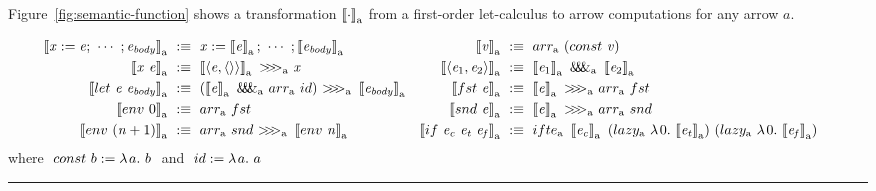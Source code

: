 \documentclass[preprint]{sigplanconf}
\newcommand{\arrow}{\rightsquigarrow}
\newcommand{\arrowarr}{\ensuremath{arr}}
\newcommand{\arrowcomp}{\ensuremath{{>}\mspace{-6mu}{>}\mspace{-6mu}{>}}}
\newcommand{\arrowpair}{\ensuremath{\mathit{\&\mspace{-7.5mu}\&\mspace{-7.5mu}\&}}}
\newcommand{\arrowif}{\ensuremath{ifte}}
\newcommand{\arrowlazy}{\ensuremath{lazy}}
\newcommand{\gen}{_\mathrm{a}}
\begin{document}
Figure~\ref{fig:semantic-function} shows a transformation $\meaningof{\cdot}\gen$ from a first-order let-calculus to arrow computations for any arrow $a$.

\begin{figure*}[t]\centering
\begin{align*}
\begin{aligned}[t]
	\meaningof{\mathit{x} := \mathit{e};\ \cdots\ ; \mathit{e_{body}}}\gen &\ :\equiv\
		\mathit{x} := \meaningof{\mathit{e}}\gen;\ \cdots \ ; \meaningof{\mathit{e_{body}}}\gen \\
	\meaningof{\mathit{x}~\mathit{e}}\gen &\ :\equiv\
		\meaningof{\pair{\mathit{e},\pair{}}}\gen~\arrowcomp\gen~\mathit{x}
\\
	\meaningof{let~\mathit{e}~\mathit{e_{body}}}\gen &\ :\equiv\ 
		(\meaningof{\mathit{e}}\gen~\arrowpair\gen~\arrowarr\gen~id)~
			\arrowcomp\gen~
		\meaningof{\mathit{e_{body}}}\gen
\\
	\meaningof{env~0}\gen &\ :\equiv\ \arrowarr\gen~fst
\\
	\meaningof{env~(\mathit{n}+1)}\gen &\ :\equiv\ \arrowarr\gen~snd~\arrowcomp\gen~\meaningof{env~\mathit{n}}\gen
\end{aligned}
&\tab
\begin{aligned}[t]
	\meaningof{\mathit{v}}\gen &\ :\equiv\ \arrowarr\gen~(const~\mathit{v})
\\
	\meaningof{\pair{\mathit{e}_1,\mathit{e}_2}}\gen &\ :\equiv\
		\meaningof{\mathit{e}_1}\gen~\arrowpair\gen~\meaningof{\mathit{e}_2}\gen
\\
	\meaningof{fst~\mathit{e}}\gen &\ :\equiv\
		\meaningof{\mathit{e}}\gen~\arrowcomp\gen~\arrowarr\gen~fst
\\
	\meaningof{snd~\mathit{e}}\gen &\ :\equiv\
		\meaningof{\mathit{e}}\gen~\arrowcomp\gen~\arrowarr\gen~snd
\\
	\meaningof{if~\mathit{e_c}~\mathit{e_t}~\mathit{e_f}}\gen &\ :\equiv\
		\arrowif\gen~
			\meaningof{\mathit{e_c}}\gen~
			(\arrowlazy\gen~\fun{0}{\meaningof{\mathit{e_t}}\gen})~
			(\arrowlazy\gen~\fun{0}{\meaningof{\mathit{e_f}}\gen})
\end{aligned}
\end{align*}
where $~const~b := \lambda\mspace{2mu}{a}\ldotp\,{b}~$ and $~id := \lambda\mspace{2mu}{a}\ldotp\,{a}~$
\vspace{0.5\baselineskip}
\hrule
\caption{Transformation from a let-calculus with first-order definitions and De-Bruijn-indexed bindings to computations in arrow $\mathrm{a}$.
}
\label{fig:semantic-function}
\end{figure*}
\end{document}
